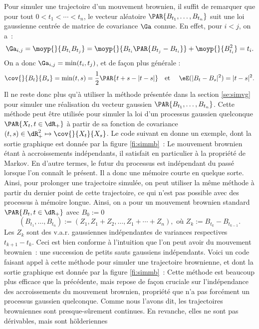 Pour simuler une trajectoire d'un mouvement brownien, il suffit de remarquer
que pour tout $0<t_1<\cdots<t_n$, le vecteur aléatoire
$\PAR{B_{t_1},\ldots,B_{t_n}}$ suit une loi gaussienne centrée de matrice de
covariance $\Ga$ connue. En effet, pour $i<j$, on a~:
$$
\Ga_{i,j}
=\moyp{}{B_{t_i}B_{t_j}}
=\moyp{}{B_{t_i}\PAR{B_{t_j}-B_{t_i}}}+\moyp{}{B_{t_i}^2}=t_i.
$$
On a donc $\Ga_{i,j}=\min(t_i,t_j)$, et de façon plus générale :
$$
\cov{}{B_t}{B_s}=\min(t,s)=\frac{1}{2}\PAR{t+s-|t-s|}
\text{\quad et \quad} 
\eE(|B_t-B_s|^2)=|t-s|^2.
$$
Il ne reste donc plus qu'à utiliser la méthode présentée dans la section
\ref{se:simvg} pour simuler une réalisation du vecteur gaussien
$\PAR{B_{t_1},\ldots,B_{t_n}}$.  Cette méthode peut être utilisée pour simuler
la loi d'un processus gaussien quelconque $\PAR{X_t,t\in\dR_+}$ à partir de sa
fonction de covariance $(t,s)\in\dR_+^2\mapsto\cov{}{X_t}{X_s}$. Le code \ML{}
suivant en donne un exemple, dont la sortie graphique est donnée par la figure
\ref{fi:simmb}~:
%
%
%
Le mouvement brownien étant à accroissements indépendants, il satisfait en
particulier à la propriété de Markov. En d'autre termes, le futur du processus
est indépendant du passé lorsque l'on connaît le présent. Il a donc une
mémoire courte en quelque sorte. Ainsi, pour prolonger une trajectoire
simulée, on peut utiliser la même méthode à partir du dernier point de cette
trajectoire, ce qui n'est pas possible avec des processus à mémoire longue.
Ainsi, on a pour un mouvement brownien standard $\PAR{B_t,t\in\dR_+}$ avec
$B_0:=0$
$$
(B_{t_1},\ldots,B_{t_n}):=(Z_1,Z_1+Z_2,\ldots,Z_1+\cdots+Z_n), \text{ où }
Z_k:=B_{t_k}-B_{t_{k-1}}.
$$
Les $Z_k$ sont des v.a.r. gaussiennes indépendantes de variances
respectives $t_{k+1}-t_k$.  Ceci est bien conforme à l'intuition que l'on peut
avoir du mouvement brownien~: une succession de petits sauts gaussiens
indépendants. Voici un code \ML{} faisant appel à cette méthode pour simuler
une trajectoire brownienne, et dont la sortie graphique est donnée par la
figure \ref{fi:simmb}~:
%
%
Cette méthode est beaucoup plus efficace que la précédente, mais repose de
façon cruciale sur l'indépendance des accroissements du mouvement brownien,
propriété que n'a pas forcément un processus gaussien quelconque.
%
%  
Comme nous l'avons dit, les trajectoires browniennes sont presque-sûrement
continues. En revanche, elles ne sont pas dérivables, mais sont hölderiennes
